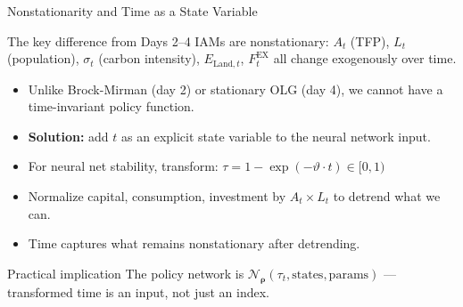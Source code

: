 \documentclass[aspectratio=169,11pt]{beamer}
\newcommand{\emphc}[1]{\textcolor{harvardcrimson}{#1}}
\newcommand{\nn}{\mathcal{N}_{\bm{\rho}}}
\begin{document}
\begin{frame}{Nonstationarity and Time as a State Variable}
\begin{alertblock}{The key difference from Days 2--4}
IAMs are \emphc{nonstationary}: $A_t$ (TFP), $L_t$ (population), $\sigma_t$ (carbon intensity), $E_{\mathrm{Land},t}$, $F^{\mathrm{EX}}_t$ all change exogenously over time.
\end{alertblock}

\vspace{0.2cm}
\begin{itemize}
    \item Unlike Brock-Mirman (day 2) or stationary OLG (day 4), we \emphc{cannot} have a time-invariant policy function.
    \item \textbf{Solution:} add $t$ as an explicit state variable to the neural network input.
    \item For neural net stability, transform: $\tau = 1 - \exp(-\vartheta \cdot t) \in [0,1)$
    \item Normalize capital, consumption, investment by $A_t \times L_t$ to detrend what we can.
    \item Time captures what \emphc{remains nonstationary} after detrending.
\end{itemize}

\vspace{0.2cm}
\begin{exampleblock}{Practical implication}
The policy network is $\nn(\tau_t, \text{states}, \text{params})$ --- transformed time is an \emphc{input}, not just an index.
\end{exampleblock}
\end{frame}
\end{document}
